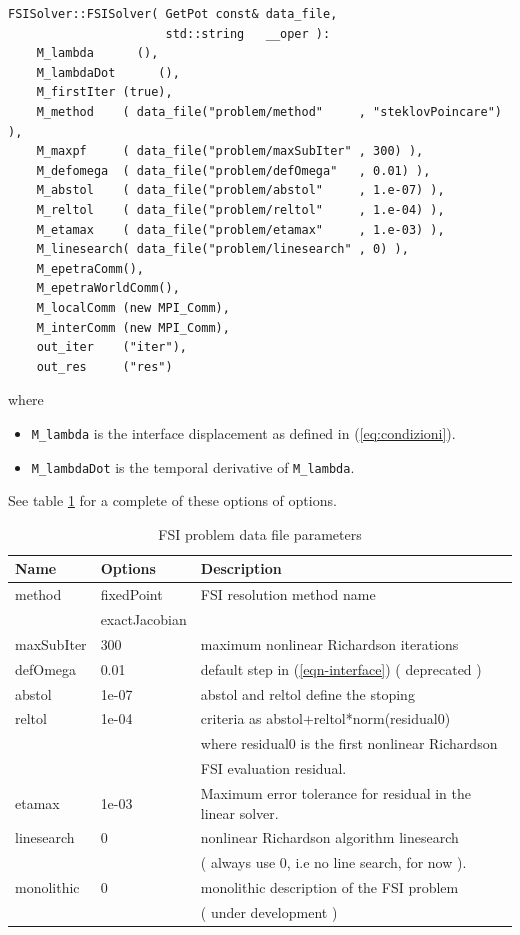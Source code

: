 \begin{verbatim}
FSISolver::FSISolver( GetPot const& data_file,
                      std::string   __oper ):
    M_lambda      (),
    M_lambdaDot      (),
    M_firstIter (true),
    M_method    ( data_file("problem/method"     , "steklovPoincare") ),
    M_maxpf     ( data_file("problem/maxSubIter" , 300) ),
    M_defomega  ( data_file("problem/defOmega"   , 0.01) ),
    M_abstol    ( data_file("problem/abstol"     , 1.e-07) ),
    M_reltol    ( data_file("problem/reltol"     , 1.e-04) ),
    M_etamax    ( data_file("problem/etamax"     , 1.e-03) ),
    M_linesearch( data_file("problem/linesearch" , 0) ),
    M_epetraComm(),
    M_epetraWorldComm(),
    M_localComm (new MPI_Comm),
    M_interComm (new MPI_Comm),
    out_iter    ("iter"),
    out_res     ("res")
\end{verbatim}


where
\begin{itemize}
\item \verb!M_lambda! is the interface displacement as defined in (\ref{eq:condizioni}).
\item \verb!M_lambdaDot! is the temporal derivative of \verb!M_lambda!.
\end{itemize}
See table \ref{table-fsiparams} for a complete of these options of options.

\begin{table}[!h]
\begin{center}
\begin{tabular}{|l|l|l|}
\hline
Name & Options & Description \\
\hline \hline
method & fixedPoint & FSI resolution method name\\
& exactJacobian & \\
\hline
maxSubIter & 300 & maximum nonlinear Richardson iterations \\
\hline
defOmega & 0.01 & default step in (\ref{eqn-interface}) ( deprecated ) \\
\hline
abstol & 1e-07 & abstol and reltol define the stoping \\
reltol & 1e-04 & criteria as abstol+reltol*norm(residual0) \\
& & where residual0 is the first nonlinear Richardson \\
& & FSI evaluation residual. \\
\hline
etamax & 1e-03 &  Maximum error tolerance for residual in the linear solver. \\
\hline
linesearch & 0 & nonlinear Richardson algorithm linesearch \\
& & ( always use 0, i.e no line search, for now ).\\
monolithic & 0 & monolithic description of the FSI problem \\
& & ( under development )\\
\hline

\end{tabular}
\end{center}
\caption{ FSI problem data file parameters
}
\label{table-fsiparams}
\end{table}



